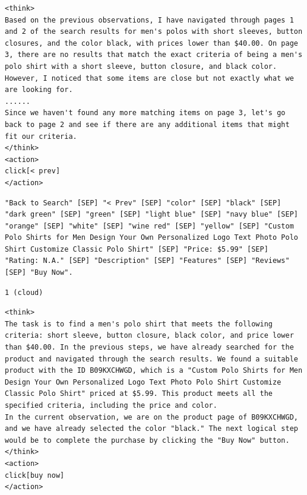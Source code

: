 \documentclass{article}
\begin{document}
\begin{devicebox}[title=Step 4: device agent output (if routed)]
\begin{lstlisting}[style=mytt]
<think>
Based on the previous observations, I have navigated through pages 1 and 2 of the search results for men's polos with short sleeves, button closures, and the color black, with prices lower than $40.00. On page 3, there are no results that match the exact criteria of being a men's polo shirt with a short sleeve, button closure, and black color. However, I noticed that some items are close but not exactly what we are looking for.
......
Since we haven't found any more matching items on page 3, let's go back to page 2 and see if there are any additional items that might fit our criteria.
</think>
<action>
click[< prev]
</action>
\end{lstlisting}
\end{devicebox}

\begin{envbox}[title=Step 11: environment]
\begin{lstlisting}[style=mytt]
"Back to Search" [SEP] "< Prev" [SEP] "color" [SEP] "black" [SEP] "dark green" [SEP] "green" [SEP] "light blue" [SEP] "navy blue" [SEP] "orange" [SEP] "white" [SEP] "wine red" [SEP] "yellow" [SEP] "Custom Polo Shirts for Men Design Your Own Personalized Logo Text Photo Polo Shirt Customize Classic Polo Shirt" [SEP] "Price: $5.99" [SEP] "Rating: N.A." [SEP] "Description" [SEP] "Features" [SEP] "Reviews" [SEP] "Buy Now".
\end{lstlisting}
\end{envbox}

\begin{herabox}[title=Step 11: Hera decision]
\begin{lstlisting}[style=mytt]
1 (cloud)
\end{lstlisting}
\end{herabox}

\begin{cloudbox}[title=Step 11: cloud agent output]
\begin{lstlisting}[style=mytt]
<think>
The task is to find a men's polo shirt that meets the following criteria: short sleeve, button closure, black color, and price lower than $40.00. In the previous steps, we have already searched for the product and navigated through the search results. We found a suitable product with the ID B09KXCHWGD, which is a "Custom Polo Shirts for Men Design Your Own Personalized Logo Text Photo Polo Shirt Customize Classic Polo Shirt" priced at $5.99. This product meets all the specified criteria, including the price and color.
In the current observation, we are on the product page of B09KXCHWGD, and we have already selected the color "black." The next logical step would be to complete the purchase by clicking the "Buy Now" button.
</think>
<action>
click[buy now]
</action>
\end{lstlisting}
\end{cloudbox}
\end{document}
